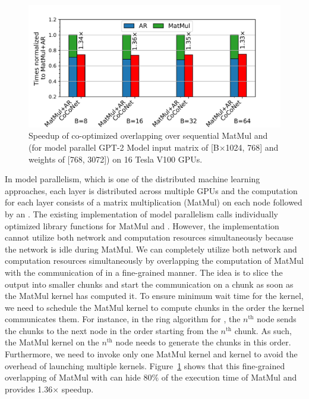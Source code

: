 \begin{figure}[t]
	\centering
  \includegraphics[width=\linewidth]{figures/matmul-overlap-with-streams-intro_small.pdf}
  \caption{Speedup of co-optimized overlapping over sequential MatMul and \allreduce (for model parallel GPT-2 Model input matrix of [B$\times$1024, 768] and weights of [768, 3072]) on 16 Tesla V100 GPUs.
  \label{fig:matmul-overlap-intro}}
\end{figure}

In model parallelism, which is one of the distributed machine learning approaches, each layer is distributed across multiple GPUs \cite{megatronlm} and the computation for each layer consists of a matrix multiplication (MatMul) on each node followed by an \allreduce. 
The existing implementation of model parallelism calls individually optimized library functions for MatMul and \allreduce.
However, the implementation cannot utilize both network and computation resources simultaneously because the network is idle during MatMul.
We can completely utilize both network and computation resources simultaneously by overlapping the computation of MatMul with the communication of \allreduce in a fine-grained manner.
The idea is to slice the output into smaller chunks and start the \allreduce communication on a chunk as soon as the MatMul kernel has computed it.
To ensure minimum wait time for the \allreduce kernel, we need to schedule the MatMul kernel to compute chunks in the order the \allreduce kernel communicates them.
For instance, in the ring algorithm for \allreduce, the $n^{\text{th}}$ node sends the chunks to the next node in the 
order starting from the $n^{\text{th}}$ chunk. 
As such, the MatMul kernel on the $n^{\text{th}}$ node needs to generate the chunks in this order. 
Furthermore, we need to invoke only one MatMul kernel and \allreduce kernel to avoid the overhead of launching multiple kernels.
Figure~\ref{fig:matmul-overlap-intro} shows that this fine-grained overlapping of MatMul with \allreduce can hide 80\% of the execution time of MatMul and provides 1.36$\times$ speedup.

